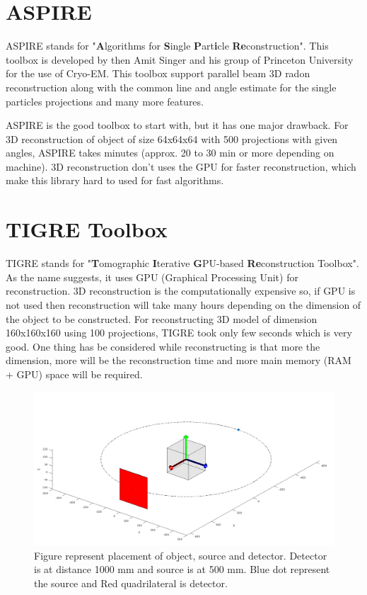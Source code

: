 \documentclass{report}
\begin{document}
\section{ASPIRE}

ASPIRE\protect\footnotemark{} stands for "\textbf{A}lgorithms for \textbf{S}ingle \textbf{P}art\textbf{i}cle \textbf{Re}construction". This toolbox is developed by then Amit Singer and his group of Princeton University for the use of Cryo-EM. This toolbox support parallel beam 3D radon reconstruction along with the common line and angle estimate for the single particles projections and many more features. 

ASPIRE is the good toolbox to start with, but it has one major drawback. For 3D reconstruction of object of size 64x64x64 with 500 projections with given angles, ASPIRE takes minutes (approx. 20 to 30 min or more depending on machine). 3D reconstruction don't uses the GPU for faster reconstruction, which make this library hard to used for fast algorithms. 

\section{TIGRE Toolbox}\label{subsec:TIGRE}
TIGRE\protect\footnotemark{} stands for "\textbf{T}omographic \textbf{I}terative \textbf{G}PU-based \textbf{Re}construction Toolbox". As the name suggests, it uses GPU (Graphical Processing Unit) for reconstruction. 3D reconstruction is the computationally expensive so, if GPU is not used then reconstruction will take many hours depending on the dimension of the object to be constructed. For reconstructing 3D model of dimension 160x160x160 using 100 projections, TIGRE took only few seconds which is very good. One thing has be considered while reconstructing is that more the dimension, more will be the reconstruction time and more main memory (RAM + GPU) space will be required. \\

\begin{figure}[H]
\includegraphics[width=1\linewidth]{tigre_projection_geomtery.png}
\centering
\captionsetup{justification=centering}
\caption{Figure represent placement of object, source and detector. Detector is at distance 1000 mm and  source is at 500 mm. Blue dot represent the source and Red quadrilateral is detector.}
\label{fig: tigre_projection_geomtery}
\end{figure}
\end{document}
